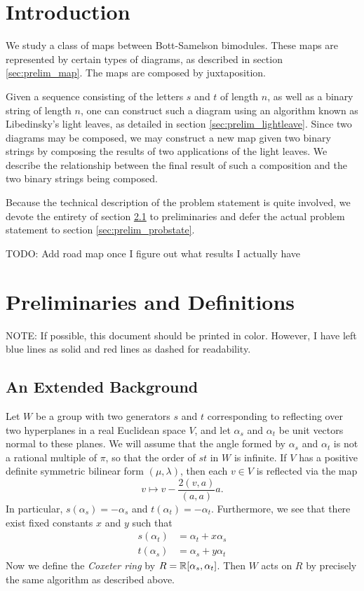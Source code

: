 
\section{Introduction}
We study a class of maps between Bott-Samelson bimodules.  These maps are represented by certain types of diagrams, as described in section \ref{sec:prelim_map}.  The maps are composed by juxtaposition.

Given a sequence consisting of the letters $s$ and $t$ of length $n$, as well as a binary string of length $n$, one can construct such a diagram using an algorithm known as Libedinsky's light leaves, as detailed in section \ref{sec:prelim_lightleave}.  Since two diagrams may be composed, we may construct a new map given two binary strings by composing the results of two applications of the light leaves.  We describe the relationship between the final result of such a composition and the two binary strings being composed.

Because the technical description of the problem statement is quite involved, we devote the entirety of section \ref{sec:prelim} to preliminaries and defer the actual problem statement to section \ref{sec:prelim_probstate}.  

TODO: Add road map once I figure out what results I actually have

\section{Preliminaries and Definitions}
NOTE: If possible, this document should be printed in color.  However, I have left blue lines as solid and red lines as dashed for readability.

\subsection{An Extended Background}
\label{sec:prelim}
Let $W$ be a group with two generators $s$ and $t$ corresponding to reflecting over two hyperplanes in a real Euclidean space $V$, and let $\alpha_s$ and $\alpha_t$ be unit vectors normal to these planes.  We will assume that the angle formed by $\alpha_s$ and $\alpha_t$ is not a rational multiple of $\pi$, so that the order of $st$ in $W$ is infinite.  If $V$ has a positive definite symmetric bilinear form $(\mu, \lambda)$, then each $v \in V$ is reflected via the map \[ v \mapsto v - \frac{2(v,a)}{(a,a)} a. \]  In particular, $s(\alpha_s) = -\alpha_s$ and $t(\alpha_t) = -\alpha_t$.  Furthermore, we see that there exist fixed constants $x$ and $y$ such that
\begin{align*}
	s(\alpha_t) &= \alpha_t + x \alpha_s \\
	t(\alpha_s) &= \alpha_s + y \alpha_t
\end{align*}
Now we define the \emph{Coxeter ring} by $R = \mathbb R[\alpha_s, \alpha_t]$.  Then $W$ acts on $R$ by precisely the same algorithm as described above.

